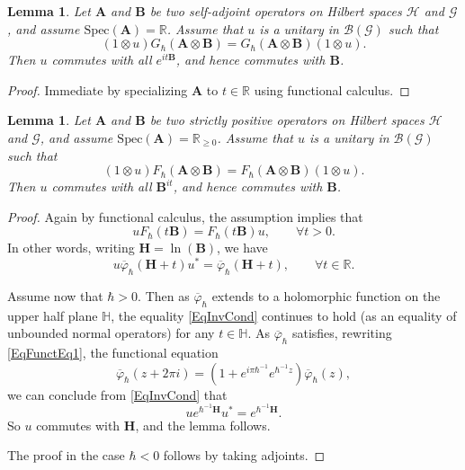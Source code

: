\documentclass[11pt, reqno]{amsart}
\newtheorem{lemma}[theorem]{Lemma}
\theoremstyle{definition}
\numberwithin{equation}{section}
\def\Gc{\mathcal G}
\def\Hc{\mathcal H}
\def\R{\mathbb R}
\newcommand{\Bc}{\mathcal{B}}
\newcommand{\Gauss}{G}
\newcommand{\bbH}{\mathbb{H}}
\newcommand{\Ab}{\mathbf{A}}
\newcommand{\Bb}{\mathbf{B}}
\newcommand{\Hb}{\mathbf{H}}
\newcommand{\Spec}{\mathrm{Spec}}
\begin{document}
\begin{lemma}\label{LemCommGauss}
Let $\Ab$ and $\Bb$ be two self-adjoint operators on Hilbert spaces $\Hc$ and $\Gc$, and assume $\Spec(\Ab) = \R$. Assume that $u$ is a unitary in $\Bc(\Gc)$ such that 
\[
(1\otimes u)\Gauss_{\hbar}(\Ab\otimes \Bb) = \Gauss_{\hbar}(\Ab\otimes \Bb)(1\otimes u). 
\]
Then $u$ commutes with all $e^{it\Bb}$, and hence commutes with $\Bb$. 
\end{lemma}
\begin{proof}
Immediate by specializing $\Ab$ to $t \in \R$ using functional calculus.
\end{proof}

\begin{lemma}\label{LemCommQDil}
Let $\Ab$ and $\Bb$ be two strictly positive operators on Hilbert spaces $\Hc$ and $\Gc$, and assume $\Spec(\Ab) = \R_{\geq0}$. Assume that $u$ is a unitary in $\Bc(\Gc)$ such that 
\[
(1\otimes u)F_{\hbar}(\Ab\otimes \Bb) = F_{\hbar}(\Ab\otimes \Bb)(1\otimes u). 
\]
Then $u$ commutes with all $\Bb^{it}$, and hence commutes with $\Bb$. 
\end{lemma}  
\begin{proof}
Again by functional calculus, the assumption implies that 
\[
u F_{\hbar}(t\Bb) = F_{\hbar}(t\Bb)u,\qquad \forall t>0. 
\]
In other words, writing $\Hb = \ln(\Bb)$, we have 
\begin{equation}\label{EqInvCond}
u\overline{\varphi}_{\hbar}(\Hb + t)u^* = \overline{\varphi}_{\hbar}(\Hb + t),\qquad \forall t\in \R. 
\end{equation}

Assume now that $\hbar>0$. Then as $\overline{\varphi}_{\hbar}$ extends to a holomorphic function on the upper half plane $\bbH$, the equality \eqref{EqInvCond} continues to hold (as an equality of unbounded normal operators) for any $t\in \bbH$. 
As $\overline{\varphi}_{\hbar}$ satisfies, rewriting \eqref{EqFunctEq1}, the functional equation 
\begin{equation}\label{EqFuncEqDilog}
\overline{\varphi}_{\hbar}(z+2\pi i) = (1+e^{i\pi \hbar^{-1}} e^{\hbar^{-1} z})\overline{\varphi}_{\hbar}(z),
\end{equation}
we can conclude from \eqref{EqInvCond} that 
\[
u e^{\hbar^{-1} \Hb} u^*=  e^{\hbar^{-1} \Hb}.
\]
So $u$ commutes with $\Hb$, and the lemma follows. 

The proof in the case $\hbar<0$ follows by taking adjoints.
\end{proof}
\end{document}
